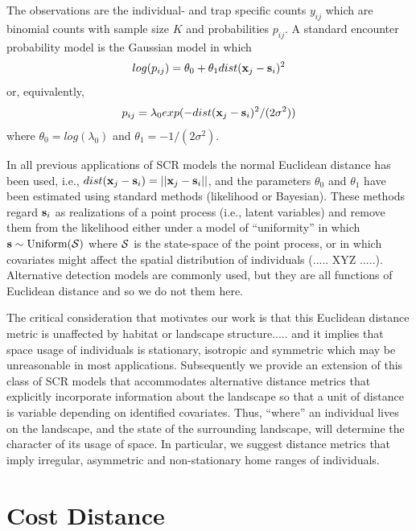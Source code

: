 \documentclass[12pt]{article}
\begin{document}
The observations are the individual- and trap specific counts $y_{ij}$
which are binomial counts with sample size $K$ and probabilities
$p_{ij}$. A standard encounter probability model
\citep{borchers_efford:2008} is the Gaussian model in which
\begin{equation}
log(p_{ij})= \theta_{0} + \theta_{1} dist({\bf x}_{j} - {\bf s}_{i})^{2}
\label{eq.encounter}
\end{equation}
or, equivalently, 
\[
p_{ij} = \lambda_{0} exp(-  dist({\bf x}_{j} - {\bf s}_{i})^{2}
/(2\sigma^{2}) )
\]
where $\theta_{0} = log(\lambda_{0})$ and $\theta_{1} =
-1/(2\sigma^2)$. 

In all previous applications of SCR models the normal Euclidean
distance has been used, i.e., $ dist({\bf x}_{j} - {\bf s}_{i}) =
||{\bf x}_{j} - {\bf s}_{i}||$,
and the parameters $\theta_0$ and $\theta_1$
have been estimated using standard methods (likelihood or
Bayesian). These methods regard ${\bf s}_{i}$ as realizations of a
point process (i.e., latent variables) and remove them from the
likelihood either under a model of ``uniformity'' in which ${\bf s}
\sim \mbox{Uniform}({\cal S})$ where ${\cal S}$ is the state-space of the
point process, or in which covariates might affect the spatial
distribution of individuals (..... XYZ .....). Alternative detection
models are commonly used, but they are all functions of Euclidean
distance and so we do not them here. 

The critical consideration that motivates our work is that this 
 Euclidean distance metric is unaffected by habitat or landscape
structure..... and it implies that space usage of individuals is
stationary, isotropic and symmetric which may be unreasonable in most
applications. 
Subsequently we provide an extension of this class of SCR models that
accommodates alternative distance metrics that explicitly incorporate
information about the landscape so that a unit of distance is variable
depending on identified covariates. Thus, ``where'' an individual
lives on the landscape, and the state of the surrounding landscape,
will determine the character of its usage of space. In particular, we
suggest distance metrics that imply irregular, asymmetric and
non-stationary home ranges of individuals. 

\section{Cost Distance}
\end{document}

